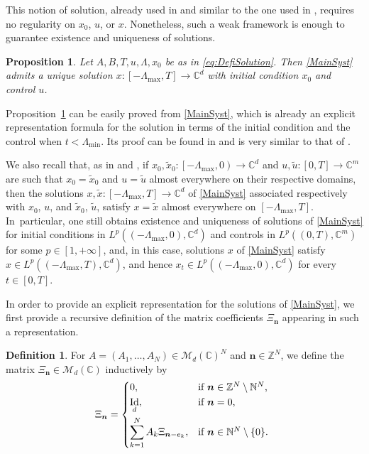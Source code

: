 \documentclass[JEP,XML,SOM,Unicode]{cedram}
\newcommand{\bn}{\boldsymbol{n}}
\theoremstyle{plain}
\newtheorem{prop}[theo]{Proposition}
\theoremstyle{definition}
\newtheorem{defi}[theo]{Definition}
\DeclareMathOperator{\id}{Id}
\begin{document}
This notion of solution, already used in \cite{Mazanti2017Relative} and similar to the one used in \cite{Chitour2016Stability}, requires no regularity on $x_0$, $u$, or $x$. Nonetheless, such a weak framework is enough to guarantee existence and uniqueness of solutions.

\begin{prop}
\label{PropControlDelayExistUnique}
Let $A,B,T,u,\Lambda,x_0$ be as in \eqref{eq:DefiSolution}. Then \eqref{MainSyst} admits a unique solution $x: \left[-\Lambda_{\max}, T\right] \to \mathbb C^d$ with initial condition $x_0$ and control $u$.
\end{prop}

Proposition~\ref{PropControlDelayExistUnique} can be easily proved from \eqref{MainSyst}, which is already an explicit representation formula for the solution in terms of the initial condition and the control when $t < \Lambda_{\min}$. Its proof can be found in \cite[Prop.\,2.2]{Mazanti2017Relative} and is very similar to that of \cite[Prop.\,3.2]{Chitour2016Stability}.

We also recall that, as in \cite[Rem.\,3.4]{Chitour2016Stability} and \cite[Rem.\,2.3]{Mazanti2017Relative}, if $x_0, \widetilde x_0: \left[-\Lambda_{\max}, 0\right) \to \mathbb C^d$ and $u, \widetilde u: [0, T] \to \mathbb C^m$ are such that $x_0 = \widetilde x_0$ and $u = \widetilde u$ almost everywhere on their respective domains, then the solutions $x, \widetilde x: \left[-\Lambda_{\max}, T\right] \to \mathbb C^d$ of \eqref{MainSyst} associated respectively with $x_0$, $u$, and $\widetilde x_0$, $\widetilde u$, satisfy $x = \widetilde x$ almost everywhere on $\left[-\Lambda_{\max}, T\right]$. In~particular, one still obtains existence and uniqueness of solutions of \eqref{MainSyst} for initial conditions in $L^p((-\Lambda_{\max}, 0), \mathbb C^d)$ and controls in $L^p((0, T), \mathbb C^m)$ for some $p \in [1, +\infty]$, and, in this case, solutions $x$ of \eqref{MainSyst} satisfy $x \in L^p(\left(-\Lambda_{\max}, T\right), \mathbb C^d)$, and hence $x_t \in L^p((-\Lambda_{\max}, 0), \mathbb C^d)$ for every $t \in [0, T]$.

In order to provide an explicit representation for the solutions of \eqref{MainSyst}, we first provide a recursive definition of the matrix coefficients $\Xi_{\bn}$ appearing in such a representation.

\begin{defi}
\label{ControlDelayDefiXi}
For $A = (A_1, \dots, A_N) \in \mathcal M_d(\mathbb C)^N$ and $\bn \in \mathbb Z^N$, we define the matrix $\Xi_{\bn} \in \mathcal M_d(\mathbb C)$ inductively by
\begin{equation}
\label{EqControlDelayDefiXi}
\Xi_{\bn} =
\begin{dcases*}
0, & if $\bn \in \mathbb Z^N \setminus \mathbb N^N$, \\
\id_d, & if $\bn = 0$, \\
\sum_{k=1}^N A_k \Xi_{\bn - e_k}, & if $\bn \in \mathbb N^N \setminus \{0\}$. \\
\end{dcases*}
\end{equation}
\end{defi}
\end{document}
